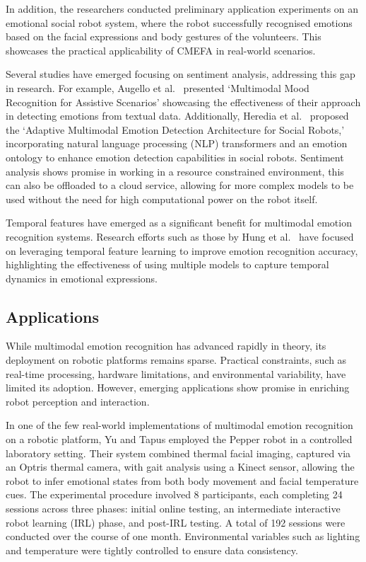 In addition, the researchers conducted preliminary application experiments on an emotional social robot system, where the robot successfully recognised emotions based on the facial expressions and body gestures of the volunteers. This showcases the practical applicability of CMEFA in real-world scenarios.

Several studies have emerged focusing on sentiment analysis, addressing this gap in research. For example, Augello et al.\ \cite{Augello2022-zy} presented `Multimodal Mood Recognition for Assistive Scenarios' showcasing the effectiveness of their approach in detecting emotions from textual data. Additionally, Heredia et al.\ \cite{Heredia2022-dt} proposed the `Adaptive Multimodal Emotion Detection Architecture for Social Robots,' incorporating natural language processing (NLP) transformers and an emotion ontology to enhance emotion detection capabilities in social robots. Sentiment analysis shows promise in working in a resource constrained environment, this can also be offloaded to a cloud service, allowing for more complex models to be used without the need for high computational power on the robot itself.

Temporal features have emerged as a significant benefit for multimodal emotion recognition systems. Research efforts such as those by Hung et al.\ \cite{Hung2020-gm} have focused on leveraging temporal feature learning to improve emotion recognition accuracy, highlighting the effectiveness of using multiple models to capture temporal dynamics in emotional expressions.

\subsection{Applications}

While multimodal emotion recognition has advanced rapidly in theory, its deployment on robotic platforms remains sparse. Practical constraints, such as real-time processing, hardware limitations, and environmental variability, have limited its adoption. However, emerging applications show promise in enriching robot perception and interaction.

In one of the few real-world implementations of multimodal emotion recognition on a robotic platform, Yu and Tapus \cite{Yu2019-ku} employed the Pepper robot in a controlled laboratory setting. Their system combined thermal facial imaging, captured via an Optris thermal camera, with gait analysis using a Kinect sensor, allowing the robot to infer emotional states from both body movement and facial temperature cues. The experimental procedure involved 8 participants, each completing 24 sessions across three phases: initial online testing, an intermediate interactive robot learning (IRL) phase, and post-IRL testing. A total of 192 sessions were conducted over the course of one month. Environmental variables such as lighting and temperature were tightly controlled to ensure data consistency.

